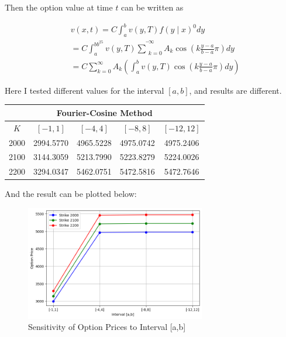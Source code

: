 \documentclass[letterpaper]{article}
\begin{document}
	  Then the option value at time $t$ can be written as
	  
	  $$
	  \begin{aligned}
	   & v(x, t)=C \int_{a}^{b} v(y, T) f(y \mid x)^{0} d y \\
	  	& =C \int_{a}^{b b^{25}} v(y, T) \bar{\sum}_{k=0}^{\infty} A_{k} \cos \left(k \frac{y-a}{b-a} \pi\right) d y \\
	  	& =C \sum_{k=0}^{\infty} A_{k}\left(\int_{a}^{b} v(y, T) \cos \left(k \frac{y-a}{b-a} \pi\right) d y\right)
	  \end{aligned}
	  $$
	
	Here I tested different values for the interval $[a,b]$, and results are different. 
	\begin{table}[h!]
		\centering
		\begin{tabular}{|c|c|c|c|c|}
			\hline
			\multicolumn{5}{|c|}{Fourier-Cosine Method} \\
			\hline
			$K$ & $[-1,1]$  & $[-4,4]$ & $[-8,8]$ & $[-12,12]$  \\
			\hline
			2000 &2994.5770 & 4965.5228  & 4975.0742 & 4975.2406\\
			\hline
			2100 & 3144.3059 & 5213.7990 & 5223.8279 & 5224.0026 \\
			\hline
			2200 & 3294.0347 & 5462.0751 & 5472.5816 & 5472.7646 \\
			\hline
		\end{tabular}
	\end{table}

And the result can be plotted below:

\begin{figure}[h]
	\caption{Sensitivity of Option Prices to Interval [a,b]}
	\centering
	\includegraphics[width=0.7\textwidth]{HW1_Q3}
\end{figure}
\end{document}
